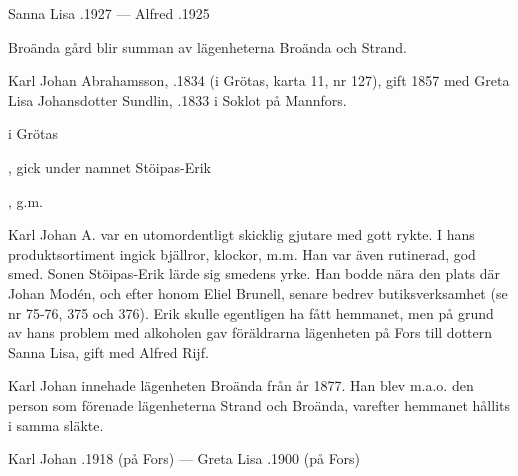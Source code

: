 Sanna Lisa .1927  ---  Alfred .1925



%

Broända gård blir summan av lägenheterna Broända och Strand.

%
Karl Johan Abrahamsson, .1834 (i Grötas, karta 11, nr 127), gift 1857 med Greta Lisa Johansdotter Sundlin, .1833 i Soklot på Mannfors.
\begin{jhchildren}
  \item {} i Grötas
  \item {}
  \item {}, gick under namnet Stöipas-Erik
  \item {}
  \item {}
  \item {}, g.m. 
\end{jhchildren}

Karl Johan A. var en utomordentligt skicklig gjutare med gott rykte. I hans produktsortiment ingick bjällror, klockor, m.m. Han var även rutinerad, god smed. Sonen Stöipas-Erik lärde sig smedens yrke. Han bodde nära den plats där Johan Modén, och efter honom Eliel Brunell, senare bedrev butiksverksamhet (se nr 75-76, 375 och 376). Erik skulle egentligen ha fått hemmanet, men på grund av hans problem med alkoholen gav föräldrarna lägenheten på Fors till dottern Sanna Lisa, gift med Alfred Rijf.

Karl Johan innehade lägenheten Broända från år 1877. Han blev m.a.o. den person som förenade lägenheterna Strand och Broända, varefter hemmanet hållits i samma släkte.

Karl Johan .1918 (på Fors)  ---  Greta Lisa .1900 (på Fors)




